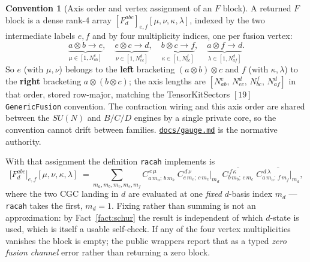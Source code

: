 \documentclass[11pt,a4paper]{article}
\theoremstyle{plain}
\theoremstyle{definition}
\newtheorem{convention}[theorem]{Convention}
\newcommand{\code}[1]{\texttt{#1}}
\newcommand{\gaugemd}{\href{https://github.com/Ryo-wtnb11/racah/blob/main/docs/gauge.md}{\code{docs/gauge.md}}}
\begin{document}
\begin{convention}[Axis order and vertex assignment of an $F$ block]
\label{conv:faxes}
A returned $F$ block is a dense rank-4 array
$[F^{abc}_d]_{e,f}[\mu,\nu,\kappa,\lambda]$, indexed by the two intermediate
labels $e,f$ and by four multiplicity indices, one per fusion vertex:
\[
  \underbrace{a\otimes b\to e}_{\displaystyle \mu\in[1,N^e_{ab}]},\quad
  \underbrace{e\otimes c\to d}_{\displaystyle \nu\in[1,N^d_{ec}]},\quad
  \underbrace{b\otimes c\to f}_{\displaystyle \kappa\in[1,N^f_{bc}]},\quad
  \underbrace{a\otimes f\to d}_{\displaystyle \lambda\in[1,N^d_{af}]}.
\]
So $e$ (with $\mu,\nu$) belongs to the \textbf{left} bracketing
$(a\otimes b)\otimes c$ and $f$ (with $\kappa,\lambda$) to the \textbf{right}
bracketing $a\otimes(b\otimes c)$; the axis lengths are
$[N^e_{ab},\,N^d_{ec},\,N^f_{bc},\,N^d_{af}]$ in that order, stored row-major,
matching the TensorKitSectors $[19]$ \code{GenericFusion} convention. The
contraction wiring and this axis order are shared between the $SU(N)$ and
$B/C/D$ engines by a single private core, so the convention cannot drift
between families. \gaugemd{} is the normative authority.
\end{convention}

With that assignment the definition \code{racah} implements is
\begin{equation}\label{eq:Fdef}
  \bigl[F^{abc}_{d}\bigr]_{e,f}[\mu,\nu,\kappa,\lambda]
  \;=\!\!\sum_{m_a,m_b,m_c,m_e,m_f}\!\!
    C^{\,e\,\mu}_{a\,m_a;\,b\,m_b}\;
    C^{\,d\,\nu}_{e\,m_e;\,c\,m_c}\Big|_{m_d}\;
    \overline{C^{\,f\,\kappa}_{b\,m_b;\,c\,m_c}}\;
    \overline{C^{\,d\,\lambda}_{a\,m_a;\,f\,m_f}\Big|_{m_d}} ,
\end{equation}
where the two CGC landing in $d$ are evaluated at one \emph{fixed} $d$-basis
index $m_d$ --- \code{racah} takes the first, $m_d=1$. Fixing rather than
summing is not an approximation: by Fact~\ref{fact:schur} the result is
independent of which $d$-state is used, which is itself a usable self-check.
If any of the four vertex multiplicities vanishes the block is empty; the
public wrappers report that as a typed \emph{zero fusion channel} error rather
than returning a zero block.
\end{document}
